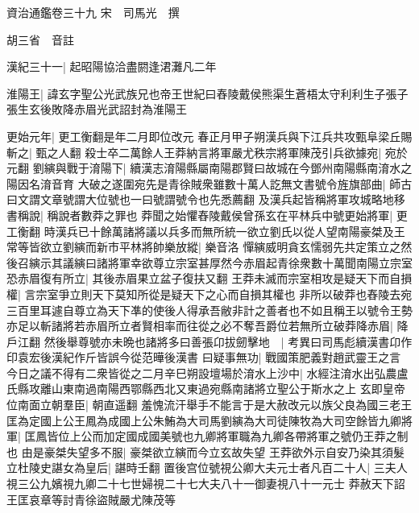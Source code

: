 資治通鑑卷三十九
宋　司馬光　撰

胡三省　音註

漢紀三十一|{
	起昭陽協洽盡閼逢涒灘凡二年}


淮陽王|{
	諱玄字聖公光武族兄也帝王世紀曰舂陵戴侯熊渠生蒼梧太守利利生子張子張生玄後敗降赤眉光武詔封為淮陽王}


更始元年|{
	更工衡翻是年二月即位改元}
春正月甲子朔漢兵與下江兵共攻甄阜梁丘賜斬之|{
	甄之人翻}
殺士卒二萬餘人王莽納言將軍嚴尤秩宗將軍陳茂引兵欲據宛|{
	宛於元翻}
劉縯與戰于淯陽下|{
	續漢志淯陽縣屬南陽郡賢曰故城在今鄧州南陽縣南淯水之陽因名淯音育}
大破之遂圍宛先是青徐賊衆雖數十萬人訖無文書號令旌旗部曲|{
	師古曰文謂文章號謂大位號也一曰號謂號令也先悉薦翻}
及漢兵起皆稱將軍攻城略地移書稱說|{
	稱說者數莽之罪也}
莽聞之始懼舂陵戴侯曾孫玄在平林兵中號更始將軍|{
	更工衡翻}
時漢兵已十餘萬諸將議以兵多而無所統一欲立劉氏以從人望南陽豪桀及王常等皆欲立劉縯而新市平林將帥樂放縱|{
	樂音洛}
憚縯威明貪玄懦弱先共定策立之然後召縯示其議縯曰諸將軍幸欲尊立宗室甚厚然今赤眉起青徐衆數十萬聞南陽立宗室恐赤眉復有所立|{
	其後赤眉果立盆子復扶又翻}
王莽未滅而宗室相攻是疑天下而自損權|{
	言宗室爭立則天下莫知所從是疑天下之心而自損其權也}
非所以破莽也舂陵去宛三百里耳遽自尊立為天下凖的使後人得承吾敝非計之善者也不如且稱王以號令王勢亦足以斬諸將若赤眉所立者賢相率而往從之必不奪吾爵位若無所立破莽降赤眉|{
	降戶江翻}
然後舉尊號亦未晩也諸將多曰善張卬拔劒擊地　|{
	考異曰司馬彪續漢書卬作印袁宏後漢紀作斤皆誤今從范曄後漢書}
曰疑事無功|{
	戰國策肥義對趙武靈王之言}
今日之議不得有二衆皆從之二月辛巳朔設壇場於淯水上沙中|{
	水經注淯水出弘農盧氏縣攻離山東南過南陽西鄂縣西北又東過宛縣南諸將立聖公于斯水之上}
玄即皇帝位南面立朝羣臣|{
	朝直遥翻}
羞愧流汗舉手不能言于是大赦改元以族父良為國三老王匡為定國上公王鳳為成國上公朱鮪為大司馬劉縯為大司徒陳牧為大司空餘皆九卿將軍|{
	匡鳳皆位上公而加定國成國美號也九卿將軍職為九卿各帶將軍之號仍王莽之制也}
由是豪桀失望多不服|{
	豪桀欲立縯而今立玄故失望}
王莽欲外示自安乃染其須髮立杜陵史諶女為皇后|{
	諶時壬翻}
置後宫位號視公卿大夫元士者凡百二十人|{
	三夫人視三公九嬪視九卿二十七世婦視二十七大夫八十一御妻視八十一元士}
莽赦天下詔王匡哀章等討青徐盜賊嚴尤陳茂等

